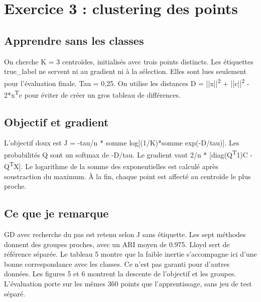 \documentclass[10pt,a4paper]{article}
\begin{document}
\newpage
\section*{Exercice 3 : clustering des points}
\subsection*{Apprendre sans les classes}
On cherche K = 3 centroïdes, initialisés avec trois points distincts. Les étiquettes true\_label ne servent ni au gradient ni à la sélection. Elles sont lues seulement pour l’évaluation finale. Tau = 0,25. On utilise les distances D = ||x||\textsuperscript{2} + ||c||\textsuperscript{2} - 2*x\textsuperscript{T}c pour éviter de créer un gros tableau de différences.

\subsection*{Objectif et gradient}
L’objectif doux est J = -tau/n * somme log[(1/K)*somme exp(-D/tau)]. Les probabilités Q sont un softmax de -D/tau. Le gradient vaut 2/n * [diag(Q\textsuperscript{T}1)C - Q\textsuperscript{T}X]. Le logarithme de la somme des exponentielles est calculé après soustraction du maximum. À la fin, chaque point est affecté au centroïde le plus proche.

\subsection*{Ce que je remarque}
GD avec recherche du pas est retenu selon J sans étiquette. Les sept méthodes donnent des groupes proches, avec un ARI moyen de 0.975. Lloyd sert de référence séparée. Le tableau 5 montre que la faible inertie s’accompagne ici d’une bonne correspondance avec les classes. Ce n’est pas garanti pour d’autres données. Les figures 5 et 6 montrent la descente de l’objectif et les groupes. L’évaluation porte sur les mêmes 360 points que l’apprentissage, sans jeu de test séparé.
\end{document}
